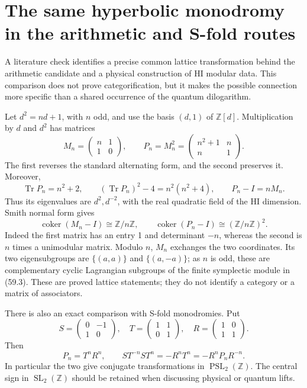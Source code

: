 \documentclass[11pt,reqno]{amsart}
\theoremstyle{plain}
\begin{document}
\section{The same hyperbolic monodromy in the arithmetic and S-fold routes}\label{sec:59}

A literature check identifies a precise common lattice transformation
behind the arithmetic candidate and a physical construction of HI
modular data. This comparison does not prove categorification, but it
makes the possible connection more specific than a shared occurrence
of the quantum dilogarithm.

Let \(d^2=nd+1\), with \(n\) odd, and use the basis \((d,1)\) of
\(\mathbb Z[d]\). Multiplication by \(d\) and \(d^2\) has matrices
\begin{equation*}
 M_n=\begin{pmatrix}n&1\\1&0\end{pmatrix},\qquad
 P_n=M_n^2=\begin{pmatrix}n^2+1&n\\n&1\end{pmatrix}.
 \tag{59.1}
\end{equation*}
The first reverses the standard alternating form, and the second
preserves it. Moreover,
\begin{equation*}
 \operatorname{Tr}P_n=n^2+2,\qquad
 (\operatorname{Tr}P_n)^2-4=n^2(n^2+4),\qquad
 P_n-I=nM_n.
 \tag{59.2}
\end{equation*}
Thus its eigenvalues are \(d^2,d^{-2}\), with the real quadratic
field of the HI dimension. Smith normal form gives
\begin{equation*}
 \operatorname{coker}(M_n-I)\cong\mathbb Z/n\mathbb Z,
 \qquad
 \operatorname{coker}(P_n-I)\cong(\mathbb Z/n\mathbb Z)^2.
 \tag{59.3}
\end{equation*}
Indeed the first matrix has an entry 1 and determinant \(-n\),
whereas the second is \(n\) times a unimodular matrix. Modulo \(n\),
\(M_n\) exchanges the two coordinates. Its two eigensubgroups are
\(\{(a,a)\}\) and \(\{(a,-a)\}\); as \(n\) is odd, these are
complementary cyclic Lagrangian subgroups of the finite symplectic
module in (59.3). These are proved lattice statements; they do not
identify a category or a matrix of associators.

There is also an exact comparison with S-fold monodromies. Put
\[
 S=\begin{pmatrix}0&-1\\1&0\end{pmatrix},\quad
 T=\begin{pmatrix}1&1\\0&1\end{pmatrix},\quad
 R=\begin{pmatrix}1&0\\1&1\end{pmatrix}.
\]
Then
\begin{equation*}
 P_n=T^nR^n,\qquad
 ST^{-n}ST^n=-R^nT^n=-R^nP_nR^{-n}.
 \tag{59.4}
\end{equation*}
In particular the two give conjugate transformations in
\(\operatorname{PSL}_2(\mathbb Z)\). The central sign in
\(\operatorname{SL}_2(\mathbb Z)\) should be retained when discussing
physical or quantum lifts.
\end{document}
